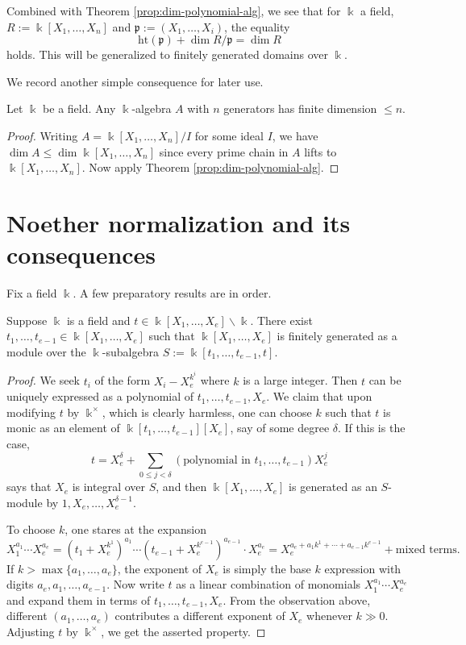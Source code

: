 Combined with Theorem \ref{prop:dim-polynomial-alg}, we see that for $\Bbbk$ a field, $R := \Bbbk[X_1, \ldots, X_n]$ and $\mathfrak{p} := (X_1, \ldots, X_i)$, the equality
\[ \text{ht}(\mathfrak{p}) + \dim R/\mathfrak{p} = \dim R \]
holds. This will be generalized to finitely generated domains over $\Bbbk$.

We record another simple consequence for later use.
\begin{corollary}\label{prop:fg-dimension-bound}
	Let $\Bbbk$ be a field. Any $\Bbbk$-algebra $A$ with $n$ generators has finite dimension $\leq n$.
\end{corollary}
\begin{proof}
	Writing $A = \Bbbk[X_1, \ldots, X_n]/I$ for some ideal $I$, we have $\dim A \leq \dim \Bbbk[X_1, \ldots, X_n]$ since every prime chain in $A$ lifts to $\Bbbk[X_1, \ldots, X_n]$. Now apply Theorem \ref{prop:dim-polynomial-alg}.
\end{proof}

\section{Noether normalization and its consequences}
Fix a field $\Bbbk$. A few preparatory results are in order.

\begin{lemma}\label{prop:normalization-Nagata}
	Suppose $\Bbbk$ is a field and $t \in \Bbbk[X_1, \ldots, X_e] \smallsetminus \Bbbk$. There exist $t_1, \ldots, t_{e-1} \in \Bbbk[X_1, \ldots, X_e]$ such that $\Bbbk[X_1, \ldots, X_e]$ is finitely generated as a module over the $\Bbbk$-subalgebra $S := \Bbbk[t_1, \ldots, t_{e-1}, t]$.
\end{lemma}
\begin{proof}
	We seek $t_i$ of the form $X_i - X_e^{k^i}$ where $k$ is a large integer. Then $t$ can be uniquely expressed as a polynomial of $t_1, \ldots, t_{e-1}, X_e$. We claim that upon modifying $t$ by $\Bbbk^\times$, which is clearly harmless, one can choose $k$ such that $t$ is monic as an element of $\Bbbk[t_1, \ldots, t_{e-1}][X_e]$, say of some degree $\delta$. If this is the case,
	\[ t = X_e^\delta + \sum_{0 \leq j < \delta} \left(\text{polynomial in } t_1, \ldots, t_{e-1}\right) X_e^j \]
	says that $X_e$ is integral over $S$, and then $\Bbbk[X_1, \ldots, X_e]$ is generated as an $S$-module by $1, X_e, \ldots, X_e^{\delta-1}$.
	
	To choose $k$, one stares at the expansion
	\[ X_1^{a_1} \cdots X_e^{a_e} = \left(t_1 + X_e^{k^1}\right)^{a_1} \cdots \left(t_{e-1} + X_e^{k^{e-1}}\right)^{a_{e-1}} \cdot X_e^{a_e} = X_e^{a_e + a_1 k^1 + \cdots + a_{e-1} k^{e-1}} + \text{mixed terms}. \]
	If $k > \max\{a_1, \ldots, a_e \}$, the exponent of $X_e$ is simply the base $k$ expression with digits $a_e, a_1, \ldots, a_{e-1}$. Now write $t$ as a linear combination of monomials $X_1^{a_1} \cdots X_e^{a_e}$ and expand them in terms of $t_1, \ldots, t_{e-1}, X_e$. From the observation above, different $(a_1, \ldots, a_e)$ contributes a different exponent of $X_e$ whenever $k \gg 0$. Adjusting $t$ by $\Bbbk^\times$, we get the asserted property.
\end{proof}

